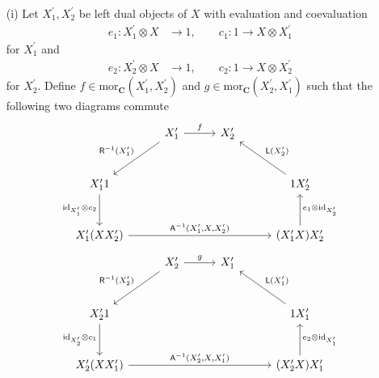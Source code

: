 \begin{prf}
\begin{enumerate}
\item[(i)]
Let $X_{1}^{\prime},X_{2}^{\prime}$ be left dual objects of $X$ with evaluation and coevaluation
\begin{align*}
  e_{1}
  \colon
  X_{1}^{\prime}
  \otimes
  X
  &\to
  1
  ,\qquad
  c_{1}
  \colon
  1
  \to
  X
  \otimes
  X_{1}^{\prime}
\end{align*}
for $X_{1}^{\prime}$ and
\begin{align*}
  e_{2}
  \colon
  X_{2}^{\prime}
  \otimes
  X
  &\to
  1
  ,\qquad
  c_{2}
  \colon
  1
  \to
  X
  \otimes
  X_{2}^{\prime}
\end{align*}
for $X_{2}^{\prime}$. Define $f \in \mathrm{mor}_{\mathbf{C}}(X_{1}^{\prime},X_{2}^{\prime})$ and $g \in \mathrm{mor}_{\mathbf{C}}(X_{2}^{\prime},X_{1}^{\prime})$ such that the following two diagrams commute
\begin{equation*}
\begin{tikzcd}[row sep=2.8em,column sep=2.8em]
  &
  X_{1}^{\prime}
  \ar{r}{f}
  \ar{dl}[swap]{\mathsf{R}^{-1}(X_{1}^{\prime})}
  &
  X_{2}^{\prime}
  &
  \\
  X_{1}^{\prime} 1
  \ar{d}[swap]{\mathrm{id}_{X_{1}^{\prime}} \otimes c_{2}}
  &
  &
  &
  1 X_{2}^{\prime}
  \ar{lu}[swap]{\mathsf{L}(X_{2}^{\prime})}
  \\
  X_{1}^{\prime} (X X_{2}^{\prime})
  \ar{rrr}{\mathsf{A}^{-1}(X_{1}^{\prime},X,X_{2}^{\prime})}
  &
  &
  &
  (X_{1}^{\prime} X) X_{2}^{\prime}
  \ar{u}[swap]{e_{1} \otimes \mathrm{id}_{X_{2}^{\prime}}}
\end{tikzcd}
\end{equation*}
\begin{equation*}
\begin{tikzcd}[row sep=2.8em,column sep=2.8em]
  &
  X_{2}^{\prime}
  \ar{r}{g}
  \ar{dl}[swap]{\mathsf{R}^{-1}(X_{2}^{\prime})}
  &
  X_{1}^{\prime}
  &
  \\
  X_{2}^{\prime} 1
  \ar{d}[swap]{\mathrm{id}_{X_{2}^{\prime}} \otimes c_{1}}
  &
  &
  &
  1 X_{1}^{\prime}
  \ar{lu}[swap]{\mathsf{L}(X_{1}^{\prime})}
  \\
  X_{2}^{\prime} (X X_{1}^{\prime})
  \ar{rrr}{\mathsf{A}^{-1}(X_{2}^{\prime},X,X_{1}^{\prime})}
  &
  &
  &
  (X_{2}^{\prime} X) X_{1}^{\prime}
  \ar{u}[swap]{e_{2} \otimes \mathrm{id}_{X_{1}^{\prime}}}
\end{tikzcd}
\end{equation*}


\end{enumerate}
\end{prf}
